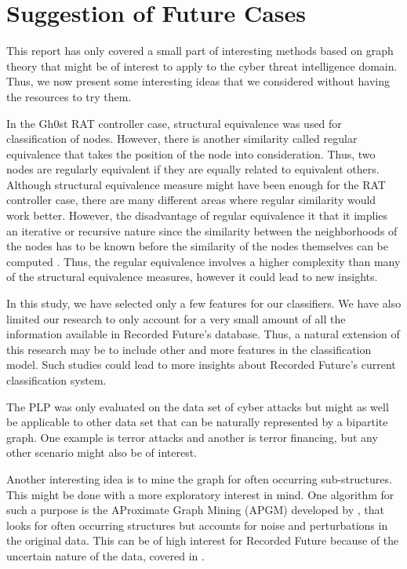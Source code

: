 \section{Suggestion of Future Cases}
This report has only covered a small part of interesting methods based on graph theory that might be of interest to apply to the cyber threat intelligence domain. Thus, we now present some interesting ideas that we considered without having the resources to try them. 

In the Gh0st RAT controller case, structural equivalence was used for classification of nodes. However, there is another similarity called regular equivalence that takes the position of the node into consideration. Thus, two nodes are regularly equivalent if they are equally related to equivalent others. Although structural equivalence measure might have been enough for the RAT controller case, there are many different areas where regular similarity would work better. However, the disadvantage of regular equivalence it that it implies an iterative or recursive nature since the similarity between the neighborhoods of the nodes has to be known before the similarity of the nodes themselves can be computed \cite{leicht2006}. Thus, the regular equivalence involves a higher complexity than many of the structural equivalence measures, however it could lead to new insights. 

In this study, we have selected only a few features for our classifiers. We have also limited our research to only account for a very small amount of all the information available in Recorded Future's database. Thus, a natural extension of this research may be to include other and more features in the classification model. Such studies could lead to more insights about Recorded Future's current classification system.

The PLP was only evaluated on the data set of cyber attacks but might as well be applicable to other data set that can be naturally represented by a bipartite graph. One example is terror attacks and another is terror financing, but any other scenario might also be of interest.

Another interesting idea is to mine the graph for often occurring sub-structures. This might be done with a more exploratory interest in mind. One algorithm for such a purpose is the AProximate Graph Mining (APGM) developed by \citet{Jia2011}, that looks for often occurring structures but accounts for noise and perturbations in the original data. This can be of high interest for Recorded Future because of the uncertain nature of the data, covered in .
